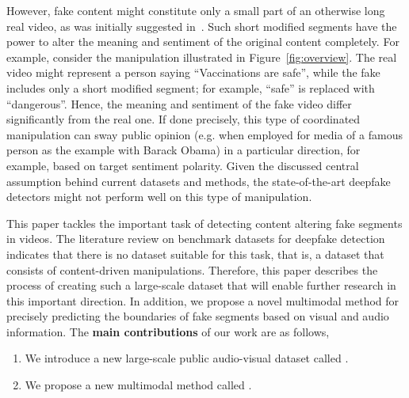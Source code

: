 \documentclass[conference, a4paper]{IEEEtran}
\makeatletter
\newcommand*{\eg}{e.g.\@\xspace}
\makeatother
\begin{document}
However, fake content might constitute only a small part of an otherwise long real video, as was initially suggested in~\cite{chugh_not_2020}. Such short modified segments have the power to alter the meaning and sentiment of the original content completely. For example, consider the manipulation illustrated in Figure~\ref{fig:overview}. The real video might represent a person saying ``Vaccinations are safe'', while the fake includes only a short modified segment; for example, ``safe'' is replaced with ``dangerous''. Hence, the meaning and sentiment of the fake video differ significantly from the real one. If done precisely, this type of coordinated manipulation can sway public opinion (\eg when employed for media of a famous person as the example with Barack Obama) in a particular direction, for example, based on target sentiment polarity. Given the discussed central assumption behind current datasets and methods, the state-of-the-art deepfake detectors might not perform well on this type of manipulation.

This paper tackles the important task of detecting content altering fake segments in videos. The literature review on benchmark datasets for deepfake detection indicates that there is no dataset suitable for this task, that is, a dataset that consists of content-driven manipulations. Therefore, this paper describes the process of creating such a large-scale dataset that will enable further research in this important direction. In addition, we propose a novel multimodal method for precisely predicting the boundaries of fake segments based on visual and audio information. The \textbf{main contributions} of our work are as follows,

\begin{enumerate}
\item{We introduce a new large-scale public audio-visual dataset called \textit{\dataset{}}.}
\item{We propose a new multimodal method called \textit{\model{}}.}
\end{enumerate}
\end{document}
